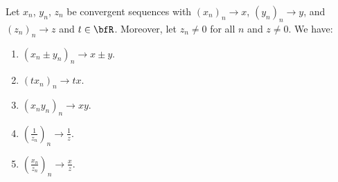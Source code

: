         \begin{theorem}
            Let $x_n$, $y_n$, $z_n$ be convergent sequences with $(x_n)_n \rightarrow x$, $(y_n)_n \rightarrow y$, and $(z_n)_n \rightarrow z$ and $t \in \bfR$. Moreover, let $z_n \neq 0$ for all $n$ and $z \neq 0$. We have:
                \begin{enumerate}[label = (\arabic*)]
                    \item $(x_n \pm y_n)_n \rightarrow x \pm y$. 
                    \item $(tx_n)_n \rightarrow tx$.
                    \item $(x_n y_n)_n \rightarrow xy$.
                    \item $\left(\frac{1}{z_n}\right)_n \rightarrow \frac{1}{z}$.
                    \item $\left(\frac{x_n}{z_n}\right)_n \rightarrow \frac{x}{z}$.
                \end{enumerate}
        \end{theorem}
